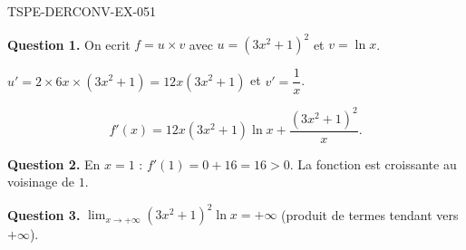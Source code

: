\begin{corrige}{TSPE-DERCONV-EX-051}

\textbf{Question 1.} On ecrit $f = u \times v$ avec $u = (3x^2+1)^2$ et $v = \ln x$.


$u' = 2 \times 6x \times (3x^2+1) = 12x(3x^2+1)$ et $v' = \dfrac{1}{x}$.

\[ f'(x) = 12x(3x^2+1)\ln x + \frac{(3x^2+1)^2}{x}. \]

\textbf{Question 2.} En $x = 1$ : $f'(1) = 0 + 16 = 16 > 0$. La fonction est croissante au voisinage de $1$.

\textbf{Question 3.} $\lim_{x \to +\infty} (3x^2+1)^2 \ln x = +\infty$ (produit de termes tendant vers $+\infty$).

\end{corrige}
